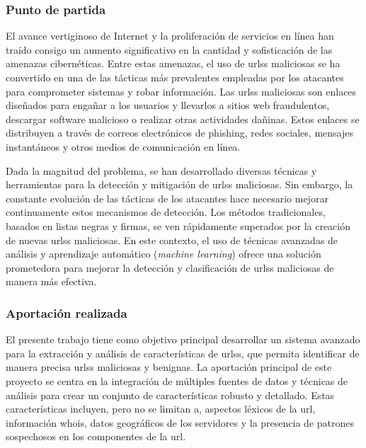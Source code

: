 \subsubsection{Punto de partida}

El avance vertiginoso de Internet y la proliferación de servicios en línea han traído consigo un aumento significativo en la cantidad y sofisticación de las amenazas cibernéticas. Entre estas amenazas, el uso de \glspl{urls} maliciosas se ha convertido en una de las tácticas más prevalentes empleadas por los atacantes para comprometer sistemas y robar información. Las \glspl{urls} maliciosas son enlaces diseñados para engañar a los usuarios y llevarlos a sitios web fraudulentos, descargar software malicioso o realizar otras actividades dañinas. Estos enlaces se distribuyen a través de correos electrónicos de \gls{phishing}, redes sociales, mensajes instantáneos y otros medios de comunicación en línea.

Dada la magnitud del problema, se han desarrollado diversas técnicas y herramientas para la detección y mitigación de \glspl{urls} maliciosas. Sin embargo, la constante evolución de las tácticas de los atacantes hace necesario mejorar continuamente estos mecanismos de detección. Los métodos tradicionales, basados en listas negras y firmas, se ven rápidamente superados por la creación de nuevas \glspl{urls} maliciosas. En este contexto, el uso de técnicas avanzadas de análisis y aprendizaje automático (\textit{machine learning}) ofrece una solución prometedora para mejorar la detección y clasificación de \glspl{urls} maliciosas de manera más efectiva.

\subsubsection{Aportación realizada}

El presente trabajo tiene como objetivo principal desarrollar un sistema avanzado para la extracción y análisis de características de \glspl{urls}, que permita identificar de manera precisa \glspl{urls} maliciosas y benignas. La aportación principal de este proyecto se centra en la integración de múltiples fuentes de datos y técnicas de análisis para crear un conjunto de características robusto y detallado. Estas características incluyen, pero no se limitan a, aspectos léxicos de la \gls{url}, información \gls{whois}, datos geográficos de los servidores y la presencia de patrones sospechosos en los componentes de la \gls{url}.

